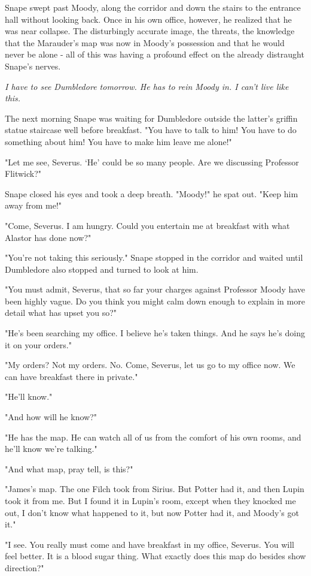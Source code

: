Snape swept past Moody, along the corridor and down the stairs to the entrance hall without looking back. Once in his own office, however, he realized that he was near collapse. The disturbingly accurate image, the threats, the knowledge that the Marauder's map was now in Moody's possession and that he would never be alone - all of this was having a profound effect on the already distraught Snape's nerves.

\emph{I have to see Dumbledore tomorrow. He has to rein Moody in. I can't live like this.}

The next morning Snape was waiting for Dumbledore outside the latter's griffin statue staircase well before breakfast. "You have to talk to him! You have to do something about him! You have to make him leave me alone!"

"Let me see, Severus. `He' could be so many people. Are we discussing Professor Flitwick?"

Snape closed his eyes and took a deep breath. "Moody!" he spat out. "Keep him away from me!"

"Come, Severus. I am hungry. Could you entertain me at breakfast with what Alastor has done now?"

"You're not taking this seriously." Snape stopped in the corridor and waited until Dumbledore also stopped and turned to look at him.

"You must admit, Severus, that so far your charges against Professor Moody have been highly vague. Do you think you might calm down enough to explain in more detail what has upset you so?"

"He's been searching my office. I believe he's taken things. And he says he's doing it on your orders."

"My orders? Not my orders. No. Come, Severus, let us go to my office now. We can have breakfast there in private."

"He'll know."

"And how will he know?"

"He has the map. He can watch all of us from the comfort of his own rooms, and he'll know we're talking."

"And what map, pray tell, is this?"

"James's map. The one Filch took from Sirius. But Potter had it, and then Lupin took it from me. But I found it in Lupin's room, except when they knocked me out, I don't know what happened to it, but now Potter had it, and Moody's got it."

"I see. You really must come and have breakfast in my office, Severus. You will feel better. It is a blood sugar thing. What exactly does this map do besides show direction?"


